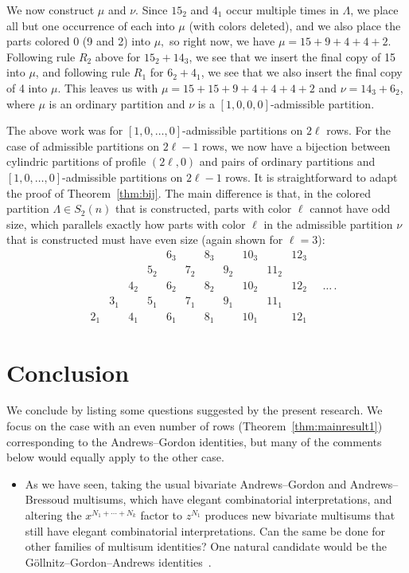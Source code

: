 \documentclass[10pt,a4paper]{amsart}
\numberwithin{equation}{section}
\theoremstyle{definition}
\begin{document}
We now construct $\mu$ and $\nu$. Since $15_2$ and $4_1$ occur multiple times in $\Lambda$, we place all but one occurrence of each into $\mu$ (with colors deleted), and we also place the parts colored 0 (9 and 2) into $\mu,$ so right now, we have $\mu = 15+9+4+4+2.$ Following rule $R_2$ above for $15_2+14_3$, we see that we insert the final copy of 15 into $\mu$, and following rule $R_1$ for $6_2+4_1$, we see that we also insert the final copy of 4 into $\mu$. This leaves us with $\mu = 15+15+9+4+4+4+2$ and $\nu = 14_3+6_2$, where $\mu$ is an ordinary partition and $\nu$ is a $[1,0,0,0]$-admissible partition.

The above work was for $[1,0,\dots,0]$-admissible partitions on $2\ell$ rows. For the case of admissible partitions on $2\ell-1$ rows, we now have a bijection between cylindric partitions of profile $(2\ell,0)$ and pairs of ordinary partitions and $[1,0,\dots,0]$-admissible partitions on $2\ell-1$ rows. It is straightforward to adapt the proof of Theorem~\ref{thm:bij}. The main difference is that, in the colored partition $\Lambda \in S_2(n)$ that is constructed, parts with color $\ell$ cannot have odd size, which parallels exactly how parts with color $\ell$ in the admissible partition $\nu$ that is constructed must have even size (again shown for $\ell=3$):
\begin{equation*}
\begin{matrix}
& && && 6_3 && 8_3 && 10_3 && 12_3\\
 && && 5_2 && 7_2 && 9_2 && 11_2 & \\
& && 4_2 && 6_2 && 8_2 && 10_2 && 12_2\\
 && 3_1 && 5_1 && 7_1 && 9_1 && 11_1 & \\
& 2_1 && 4_1 && 6_1 && 8_1 && 10_1 && 12_1
 \end{matrix}\quad\dots\,.
\end{equation*}


\section{Conclusion}\label{sec:conc7}

We conclude by listing some questions suggested by the present research. We focus on the case with an even number of rows (Theorem~\ref{thm:mainresult1}) corresponding to the Andrews--Gordon identities, but many of the comments below would equally apply to the other case.
\begin{itemize}\itemsep=0pt
 \item As we have seen, taking the usual bivariate Andrews--Gordon and Andrews--Bressoud multisums, which have elegant combinatorial interpretations, and altering the $x^{N_1+\cdots+N_k}$ factor to $z^{N_1}$ produces new bivariate multisums that still have elegant combinatorial interpretations. Can the same be done for other families of multisum identities? One natural candidate would be the G\"ollnitz--Gordon--Andrews identities~\cite{And_GGA1,And_GGA2}.
 \end{itemize}
\end{document}
